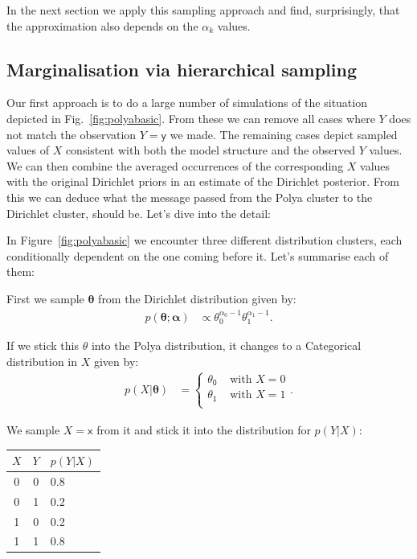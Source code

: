 \documentclass[oneside,english]{scrbook}
\begin{document}
In the next section we apply this sampling approach and find,
surprisingly, that the approximation also depends on the $\alpha_k$
values.

\subsection{Marginalisation via hierarchical sampling}

Our first approach is to do a large number of simulations of the
situation depicted in Fig.~\ref{fig:polyabasic}. From these we can
remove all cases where $Y$ does not match the observation
$Y=\mathsf{y}$ we made. The remaining cases depict sampled values of
$X$ consistent with both the model structure and the observed $Y$
values. We can then combine the averaged occurrences of the
corresponding $X$ values with the original Dirichlet priors in an
estimate of the Dirichlet posterior. From this we can deduce what the
message passed from the Polya cluster to the Dirichlet cluster, should
be. Let's dive into the detail:

In Figure~\ref{fig:polyabasic} we encounter three different
distribution clusters, each conditionally dependent on the one coming
before it. Let's summarise each of them:

First we sample $\bm{\theta}$ from the Dirichlet distribution given by:
\begin{align*}
  p(\bm{\theta};\bm{\alpha}) &\propto \theta_0^{\alpha_0-1}\theta_1^{\alpha_1-1}.
\end{align*}

If we stick this $\bm{\mathsf{\theta}}$ into the Polya distribution,
it changes to a Categorical distribution in $X$ given by:
\begin{align*}
  p(X|\bm{\theta}) &= \left\{
    \begin{array}{lr}
    \mathsf{\theta_0} & \mbox{ with } X=0\\
    \mathsf{\theta_1} & \mbox{ with } X=1\\
    \end{array}
    \right..
\end{align*}

We sample $X=\mathsf{x}$ from it and stick it into the distribution
for $p(Y|X)$:\\
    \begin{center}
    \begin{tabular}{c c|l}
    $X$ & $Y$ & $p(Y|X)$\\ \hline
    0 & 0 & 0.8 \\
    0 & 1 & 0.2 \\
    1 & 0 & 0.2 \\
    1 & 1 & 0.8
    \end{tabular}
    \end{center}
\end{document}
